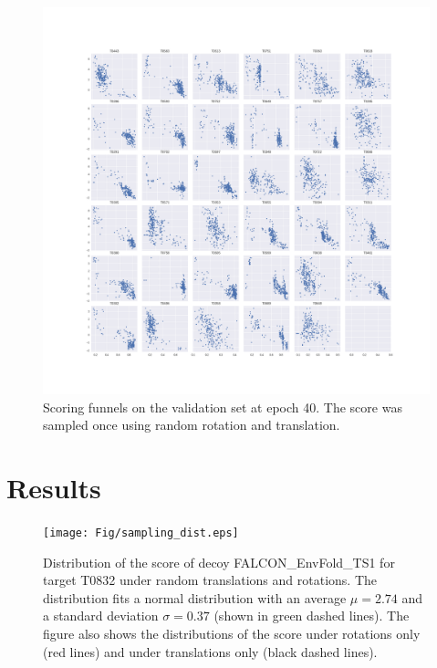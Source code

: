 \documentclass[letter,10pt]{article}
\begin{document}
\begin{figure}[H]
    \centering
    \includegraphics[width=\linewidth]{Fig/epoch40_funnels.png}
    \caption{Scoring funnels on the validation set at epoch 40. The score was sampled once using random rotation and translation.}
    \label{Fig:ValidationEpoch40}
\end{figure}

\section{Results}

\begin{figure}[H]
    \centering
    \texttt{[image: Fig/sampling\_dist.eps]}
%
    \caption{Distribution of the score of decoy FALCON\_EnvFold\_TS1
    for target T0832 under random translations and rotations. The
    distribution fits a normal distribution with an average $\mu =
    2.74$ and a standard deviation $\sigma = 0.37$ (shown in green
    dashed lines). The figure also shows the distributions of the
    score under rotations only (red lines) and under translations only
    (black dashed lines).}
%
    \label{Fig:ScoreDistribution}
\end{figure}
\end{document}
